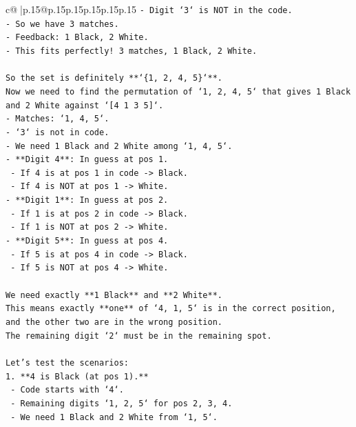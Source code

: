 \documentclass{article}
\begin{document}
{\begin{supertabular}{c@{$\;$}|p{.15\linewidth}@{}p{.15\linewidth}p{.15\linewidth}p{.15\linewidth}p{.15\linewidth}p{.15\linewidth}}
{{{\texttt{{-} Digit `3` is NOT in the code.} \\
\texttt{{-} So we have 3 matches.} \\
\texttt{{-} Feedback: 1 Black, 2 White.} \\
\texttt{{-} This fits perfectly! 3 matches, 1 Black, 2 White.} \\
\\ 
\texttt{So the set is definitely **`\{1, 2, 4, 5\}`**.} \\
\texttt{Now we need to find the permutation of `1, 2, 4, 5` that gives 1 Black and 2 White against `{[}4 1 3 5{]}`.} \\
\texttt{{-} Matches: `1, 4, 5`.} \\
\texttt{{-} `3` is not in code.} \\
\texttt{{-} We need 1 Black and 2 White among `1, 4, 5`.} \\
\texttt{{-} **Digit 4**: In guess at pos 1.} \\
\texttt{  {-} If 4 is at pos 1 in code {-}> Black.} \\
\texttt{  {-} If 4 is NOT at pos 1 {-}> White.} \\
\texttt{{-} **Digit 1**: In guess at pos 2.} \\
\texttt{  {-} If 1 is at pos 2 in code {-}> Black.} \\
\texttt{  {-} If 1 is NOT at pos 2 {-}> White.} \\
\texttt{{-} **Digit 5**: In guess at pos 4.} \\
\texttt{  {-} If 5 is at pos 4 in code {-}> Black.} \\
\texttt{  {-} If 5 is NOT at pos 4 {-}> White.} \\
\\ 
\texttt{We need exactly **1 Black** and **2 White**.} \\
\texttt{This means exactly **one** of `4, 1, 5` is in the correct position, and the other two are in the wrong position.} \\
\texttt{The remaining digit `2` must be in the remaining spot.} \\
\\ 
\texttt{Let's test the scenarios:} \\
\texttt{1.  **4 is Black (at pos 1).**} \\
\texttt{    {-} Code starts with `4`.} \\
\texttt{    {-} Remaining digits `1, 2, 5` for pos 2, 3, 4.} \\
\texttt{    {-} We need 1 Black and 2 White from `1, 5`.} \\
}}}
\end{supertabular}}
\end{document}
